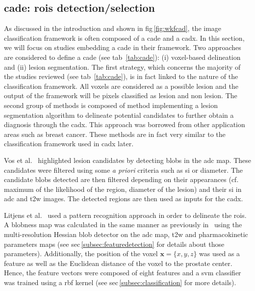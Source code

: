 \subsection{\ac{cade}: \acp{roi} detection/selection}\label{cade}

As discussed in the introduction and shown in \ac{fig}\,\ref{fig:wkfcad}, the image classification framework is often composed of a \ac{cade} and a \ac{cadx}. In this section, we will focus on studies embedding a \ac{cade} in their framework. Two approaches are considered to define a \ac{cade} (see \ac{tab}~\ref{tab:cade}): (i) voxel-based delineation and (ii) lesion segmentation.
The first strategy, which concerns the majority of the studies reviewed (see \ac{tab}~\ref{tab:cade}), is in fact linked to the nature of the classification framework. All voxels are considered as a possible lesion and the output of the framework will be pixels classified as lesion and non lesion.
The second group of methods is composed of method implementing a lesion segmentation algorithm to delineate potential candidates to further obtain a diagnosis through the \ac{cadx}. This approach was borrowed from other application areas such as breast cancer. These methods are in fact very similar to the classification framework used in \ac{cadx} later.

Vos et al.~\cite{Vos2012} highlighted lesion candidates by detecting blobs in the \ac{adc} map. These candidates were filtered using some \textit{a priori} criteria such as \ac{si} or diameter. The candidate blobs detected are then filtered depending on their appearances (cf. maximum of the likelihood of the region, diameter of the lesion) and their \ac{si} in \ac{adc} and \ac{t2w} images. The detected regions are then used as inputs for the \ac{cadx}.

Litjens et al.~\cite{Litjens2011} used a pattern recognition approach in order to delineate the \acp{roi}. A blobness map was calculated in the same manner as previously in~\cite{Vos2010} using the multi-resolution Hessian blob detector on the \ac{adc} map, \ac{t2w} and pharmacokinetic parameters maps (see \ac{sec}\,\ref{subsec:featuredetection} for details about those parameters). Additionally, the position of the voxel $\mathbf{x}=\{x,y,z\}$ was used as a feature as well as the Euclidean distance of the voxel to the prostate center. Hence, the feature vectors were composed of eight features and a \ac{svm} classifier was trained using a \ac{rbf} kernel (see \ac{sec}\,\ref{subsec:classification} for more details).

